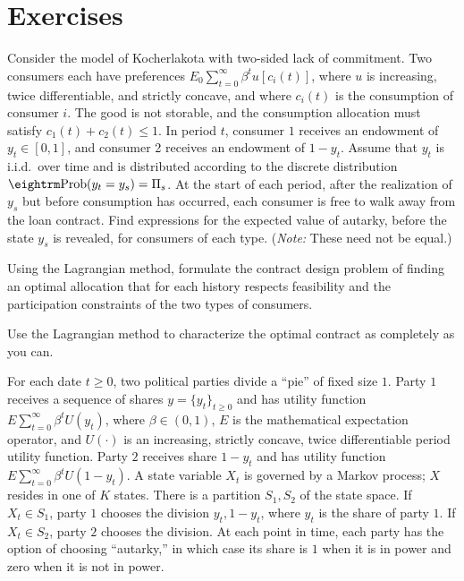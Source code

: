 \section{Exercises}
\showchaptIDtrue
\showsectIDtrue
\medskip
{}
\smallskip
\noindent
   Consider the model of Kocherlakota with two-sided
lack of commitment. Two consumers each
have preferences $E_0 \sum_{t=0}^\infty \beta^t u[c_i(t)]$,
where $u$ is increasing, twice differentiable, and strictly
concave, and
where $c_i(t)$ is the consumption of consumer $i$.
The good is not storable, and the consumption allocation must satisfy
$c_1(t) + c_2(t) \leq 1$.  In period $t$, consumer $1$ receives
an endowment of
$y_t \in [0, 1]$, and consumer   2 receives an endowment
of $1 - y_t$.  Assume that $y_t$ is i.i.d.\ over time and is
distributed according to the discrete distribution
${\rm Prob} (y_t = y_s) = \Pi_s$.  At the start of  each period,
after the realization of $y_s$ but before consumption has occurred,
each consumer is free to walk away from the loan contract.
\medskip
{}    Find expressions for
the expected value of autarky, before the state $y_s$ is revealed, for
consumers of each type.  ({\it Note:} These need not be equal.)

\medskip
{}  Using the Lagrangian method, formulate
the contract design problem of finding an optimal allocation
that for each history respects feasibility and the participation constraints
of the two types of consumers.

\medskip
{}  Use the Lagrangian method to characterize the
optimal contract as completely as you can.

\medskip

\medskip
\noindent For each date $t \geq 0$,
 two political parties divide a ``pie'' of fixed size $1$.  Party
$1$ receives  a sequence of shares $ y =\{y_t\}_{t \geq 0}$
and has   utility function
$E\sum_{t=0}^\infty \beta^t U(y_t)$, where $\beta \in (0,1)$,
$E$ is  the  mathematical  expectation operator,
and $U(\cdot)$ is an increasing, strictly concave, twice
differentiable period utility function. Party $2$ receives
share $1-y_t$ and has utility function
$E \sum_{t=0}^\infty \beta^t U(1-y_t)$.   A state variable
 $X_t$ is governed by  a
 Markov   process; $X$ resides in one of $K$ states.   There
is a partition $S_1, S_2$ of the state space.  If     $X_t \in S_1$,
party $1$ chooses the division $y_t, 1-y_t$, where
$y_t$ is the share of party $1$.  If $X_t \in S_2$, party
$2$ chooses the division.
At each point in  time, each  party has  the option
of choosing ``autarky,'' in which  case its share is $1$ when
it is in power and zero when it is not in power.

